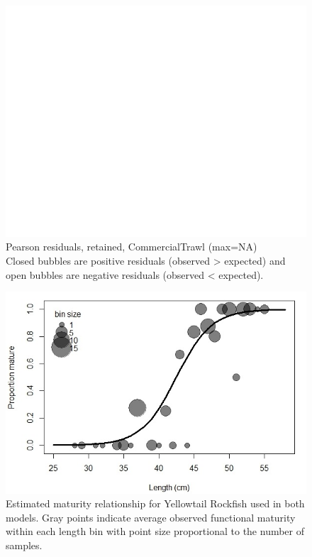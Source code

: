 \documentclass[12pt,]{article}
\begin{document}
\begin{figure}[htbp]
\centering
\includegraphics{./r4ss/plots_mod1/comp_gstlenfit_residsflt1mkt2.png}
\caption{Pearson residuals, retained, CommercialTrawl (max=NA)\\
Closed bubbles are positive residuals (observed \textgreater{} expected)
and open bubbles are negative residuals (observed \textless{} expected).
\label{fig:mod1_40_comp_gstlenfit_residsflt1mkt2}}
\end{figure}

\FloatBarrier

\begin{figure}[htbp]
\centering
\includegraphics{Figures/YT_Propmat_update3_22.jpeg}
\caption{Estimated maturity relationship for Yellowtail Rockfish used in
both models. Gray points indicate average observed functional maturity
within each length bin with point size proportional to the number of
samples.\label{fig:maturity}}
\end{figure}
\end{document}
